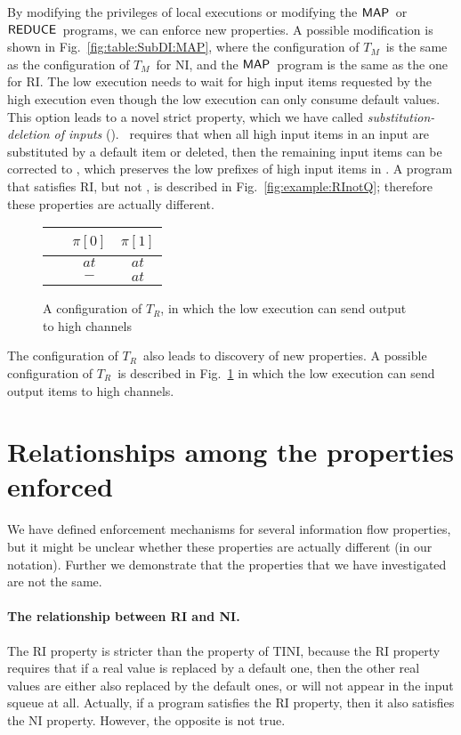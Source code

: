 \documentclass[10pt,a4paper,oneside]{article}
\def\TAV{\ensuremath{T_{M}}}
\def\TPV{\ensuremath{T_{R}}}
\def\sanserif#1{\ensuremath{\sf #1}}
\def\REDUCE{\ensuremath{\sanserif{REDUCE}}}
\def\MAP{\ensuremath{\sanserif{MAP}}}
\def\Prog{\ensuremath{\pi}}
\def\Progl#1{\ensuremath{\Prog[#1]}}
\def\prop1{\text{SubDI}}
\def\tnoaction{\ensuremath{-}}
\def\ttellput{\ensuremath{at}}
\def\tindex#1{\ensuremath{\Progl{#1}}}
\begin{document}
By modifying the privileges of local executions or modifying the \MAP\ or \REDUCE\ programs, we can enforce new properties. A possible modification is shown in Fig.~\ref{fig:table:SubDI:MAP}, where the configuration of \TAV\ is the same as the configuration of \TAV\ for NI, and the \MAP\ program is the same as the one for RI. The low execution needs to wait for high input items requested by the high execution even though the low execution can only consume default values. This option leads to a novel strict property, which we have called \emph{substitution-deletion of inputs} (\prop1). \prop1\ requires that when all high input items in an input  are substituted by a default item or deleted, then the remaining input items can be corrected to , which preserves the low prefixes of high input items in . A program that satisfies RI, but not , is described in Fig.~\ref{fig:example:RInotQ}; therefore these properties are actually different.

\begin{figure}
\centering
\begin{tabular}{|c|c|c|}
\hline
~ &  \tindex{0} & \tindex{1} \\
\hline
 & \ttellput & \ttellput \\
\hline
 & \tnoaction & \ttellput \\
\hline
\end{tabular}
\caption{A configuration of \TPV, in which the low execution can send output to high channels}
\label{fig:table:NI:nowaitoption}
\end{figure}



The configuration of \TPV\ also leads to discovery of new properties. A possible configuration of \TPV\ is described in Fig.~\ref{fig:table:NI:nowaitoption} in which the low execution can send output items to high channels.

\section{Relationships among the properties enforced}\label{sec:discussion:relationship}
We have defined enforcement mechanisms for several information flow properties, but it might be unclear whether these properties are actually different (in our notation). Further we demonstrate that the properties that we have investigated are not the same.






\paragraph{The relationship between RI and NI.}\label{sec:discussion:relationship:rini}
The RI property is stricter than the property of TINI, because the RI property requires that if a real value is replaced by a default one, then the other real values are either also replaced by the default ones, or will not appear in the input squeue at all. Actually, if a program satisfies the RI property, then it also satisfies the NI property. However, the opposite is not true.
\end{document}
